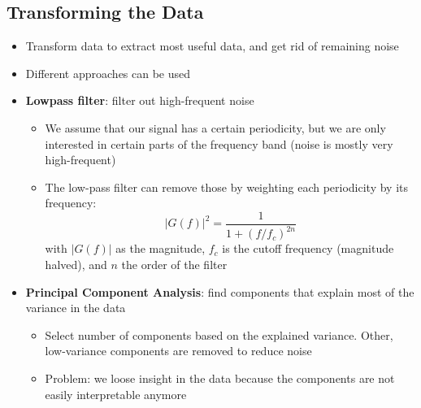 \subsection{Transforming the Data}
\begin{itemize}
	\item Transform data to extract most useful data, and get rid of remaining noise
	\item Different approaches can be used
	\item \textbf{Lowpass filter}: filter out high-frequent noise
	\begin{itemize}
		\item We assume that our signal has a certain periodicity, but we are only interested in certain parts of the frequency band (noise is mostly very high-frequent)
		\item The low-pass filter can remove those by weighting each periodicity by its frequency:
		$$|G(f)|^2 = \frac{1}{1+\left(f/f_c\right)^{2n}}$$
		with $|G(f)|$ as the magnitude, $f_c$ is the cutoff frequency (magnitude halved), and $n$ the order of the filter
	\end{itemize}
	\item \textbf{Principal Component Analysis}: find components that explain most of the variance in the data
	\begin{itemize}
		\item Select number of components based on the explained variance. Other, low-variance components are removed to reduce noise 
		\item Problem: we loose insight in the data because the components are not easily interpretable anymore
	\end{itemize}
\end{itemize}